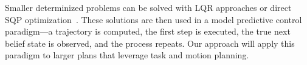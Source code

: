 Smaller determinized problems can be solved with LQR approaches or
direct SQP optimization~\cite{platt2010belief,
  patil2014scaling}. These solutions are then used in a model
predictive control paradigm---a trajectory is computed, the first step
is executed, the true next belief state is observed, and the process
repeats. Our approach will apply this paradigm to larger plans that
leverage task and motion planning.
